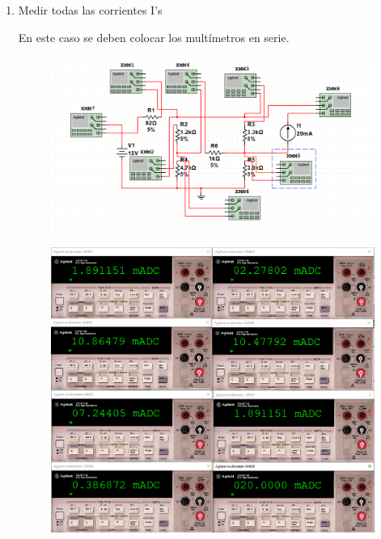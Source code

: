 \documentclass[12pt,a4paper]{article}
\begin{document}
\begin{enumerate}
\newpage



\item Medir todas las corrientes I's

En este caso se deben colocar los multímetros en serie.

\begin{figure}[h!]
    \centering
    \includegraphics[scale=0.4]{circuito corrientes.PNG}
    \label{fig:my_label}
\end{figure}

\begin{figure}[h!]
    \centering
    \includegraphics[scale=0.4]{corrientes medidas.PNG}
    \label{fig:my_label}
\end{figure}




\end{enumerate}
\end{document}
